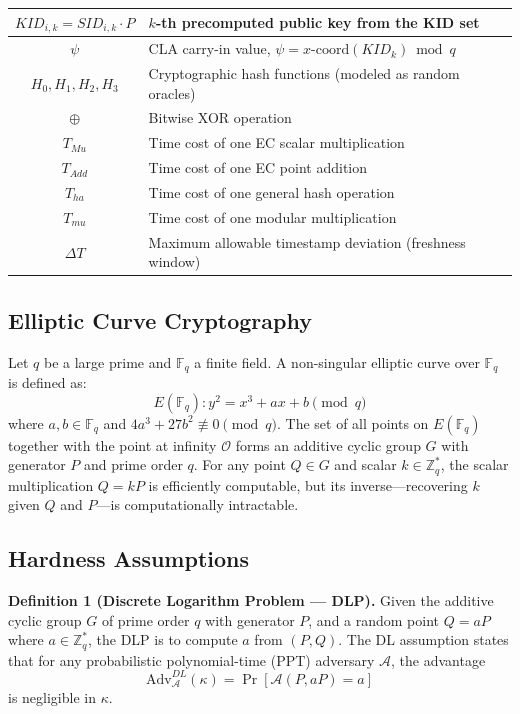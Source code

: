 \documentclass[conference]{IEEEtran}
\begin{document}
\begin{table}[htbp]
\begin{tabular}{|c|p{4.5cm}|}
$KID_{i,k} = SID_{i,k} \cdot P$ & $k$-th precomputed public key from the KID set \\
\hline
$\psi$ & CLA carry-in value, $\psi = x\text{-coord}(KID_k) \bmod q$ \\
\hline
$H_0, H_1, H_2, H_3$ & Cryptographic hash functions (modeled as random oracles) \\
\hline
$\oplus$ & Bitwise XOR operation \\
\hline
$T_{Mu}$ & Time cost of one EC scalar multiplication \\
\hline
$T_{Add}$ & Time cost of one EC point addition \\
\hline
$T_{ha}$ & Time cost of one general hash operation \\
\hline
$T_{mu}$ & Time cost of one modular multiplication \\
\hline
$\Delta T$ & Maximum allowable timestamp deviation (freshness window) \\
\hline
\end{tabular}
\end{table}

\subsection{Elliptic Curve Cryptography}

Let $q$ be a large prime and $\mathbb{F}_q$ a finite field. A non-singular elliptic curve over $\mathbb{F}_q$ is defined as:
\begin{equation}
E(\mathbb{F}_q) : y^2 = x^3 + ax + b \pmod{q}
\end{equation}
where $a, b \in \mathbb{F}_q$ and $4a^3 + 27b^2 \not\equiv 0 \pmod{q}$. The set of all points on $E(\mathbb{F}_q)$ together with the point at infinity $\mathcal{O}$ forms an additive cyclic group $G$ with generator $P$ and prime order $q$. For any point $Q \in G$ and scalar $k \in \mathbb{Z}_q^*$, the scalar multiplication $Q = kP$ is efficiently computable, but its inverse—recovering $k$ given $Q$ and $P$—is computationally intractable.

\subsection{Hardness Assumptions}

\textbf{Definition 1 (Discrete Logarithm Problem — DLP).} Given the additive cyclic group $G$ of prime order $q$ with generator $P$, and a random point $Q = aP$ where $a \in \mathbb{Z}_q^*$, the DLP is to compute $a$ from $(P, Q)$. The DL assumption states that for any probabilistic polynomial-time (PPT) adversary $\mathcal{A}$, the advantage
\begin{equation}
\text{Adv}^{DL}_{\mathcal{A}}(\kappa) = \Pr[\mathcal{A}(P, aP) = a]
\end{equation}
is negligible in $\kappa$.
\end{document}
